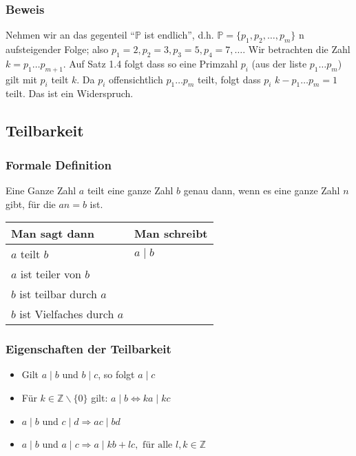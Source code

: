 \subsubsection*{Beweis}
Nehmen wir an das gegenteil ``$\mathbb{P}$ ist endlich'', d.h. $\mathbb{P}=\{p_1,p_2,\dots,p_m\}$ n aufsteigender Folge; also $p_1=2,p_2=3,p_3=5,p_4=7,\dots$. Wir betrachten die Zahl $k=p_1\dots p_{m+1}$. Auf Satz 1.4 folgt dass so eine Primzahl $p_i$ (aus der liste $p_1\dots p_{m}$) gilt mit $p_i$ teilt $k$. Da $p_i$ offensichtlich $p_1\dots p_{m}$ teilt, folgt dass $p_i$ $k-p_1\dots p_{m}=1$ teilt. Das ist ein Widerspruch. 

\subsection*{Teilbarkeit}
\subsubsection{Formale Definition}
Eine Ganze Zahl $a$ teilt eine ganze Zahl $b$ genau dann, wenn es eine ganze Zahl $n$ gibt, für die $an=b$ ist. \\
\begin{center}
\begin{tabular}{l|l}
Man sagt dann & Man schreibt \\\hline 
$a$ teilt $b$ & $a\mid b$\\
$a$ ist teiler von $b$ & ~\\
$b$ ist teilbar durch $a$ & ~\\
$b$ ist Vielfaches durch $a$ & ~\\
\end{tabular}
\end{center}

\subsubsection*{Eigenschaften der Teilbarkeit}
\begin{itemize}
\item Gilt $a\mid b$ und $b\mid c$, so folgt $a\mid c$
\item Für $k\in\mathbb{Z}\backslash\{0\}$ gilt: $a\mid b\Longleftrightarrow ka\mid kc$ 
\item $a\mid b$ und $c\mid d\Rightarrow ac\mid bd$
\item $a\mid b$ und $a\mid c\Rightarrow a\mid kb+lc,\text{    für alle }l,k\in\mathbb{Z}$
\end{itemize}

